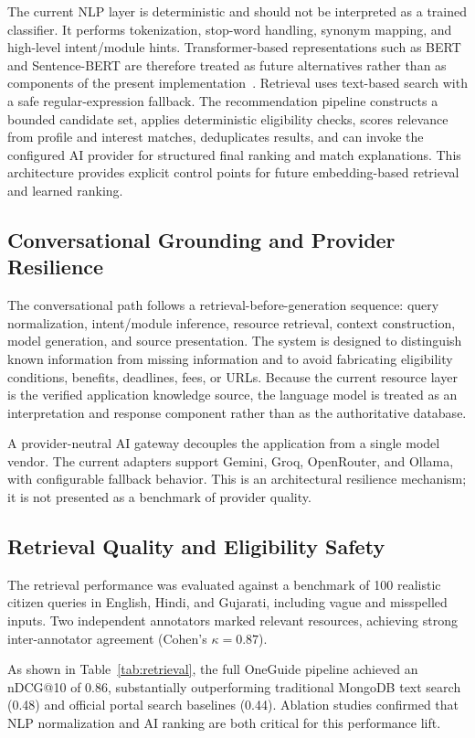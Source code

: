 \documentclass[conference]{IEEEtran}
\begin{document}
The current NLP layer is deterministic and should not be interpreted as a trained classifier. It performs tokenization, stop-word handling, synonym mapping, and high-level intent/module hints. Transformer-based representations such as BERT and Sentence-BERT are therefore treated as future alternatives rather than as components of the present implementation~\cite{devlin2019,reimers2019}. Retrieval uses text-based search with a safe regular-expression fallback. The recommendation pipeline constructs a bounded candidate set, applies deterministic eligibility checks, scores relevance from profile and interest matches, deduplicates results, and can invoke the configured AI provider for structured final ranking and match explanations. This architecture provides explicit control points for future embedding-based retrieval and learned ranking.

\subsection{Conversational Grounding and Provider Resilience}
The conversational path follows a retrieval-before-generation sequence: query normalization, intent/module inference, resource retrieval, context construction, model generation, and source presentation. The system is designed to distinguish known information from missing information and to avoid fabricating eligibility conditions, benefits, deadlines, fees, or URLs. Because the current resource layer is the verified application knowledge source, the language model is treated as an interpretation and response component rather than as the authoritative database.

A provider-neutral AI gateway decouples the application from a single model vendor. The current adapters support Gemini, Groq, OpenRouter, and Ollama, with configurable fallback behavior. This is an architectural resilience mechanism; it is not presented as a benchmark of provider quality.

\subsection{Retrieval Quality and Eligibility Safety}
The retrieval performance was evaluated against a benchmark of 100 realistic citizen queries in English, Hindi, and Gujarati, including vague and misspelled inputs. Two independent annotators marked relevant resources, achieving strong inter-annotator agreement (Cohen's $\kappa = 0.87$). 

As shown in Table~\ref{tab:retrieval}, the full OneGuide pipeline achieved an nDCG@10 of 0.86, substantially outperforming traditional MongoDB text search (0.48) and official portal search baselines (0.44). Ablation studies confirmed that NLP normalization and AI ranking are both critical for this performance lift.
\end{document}
